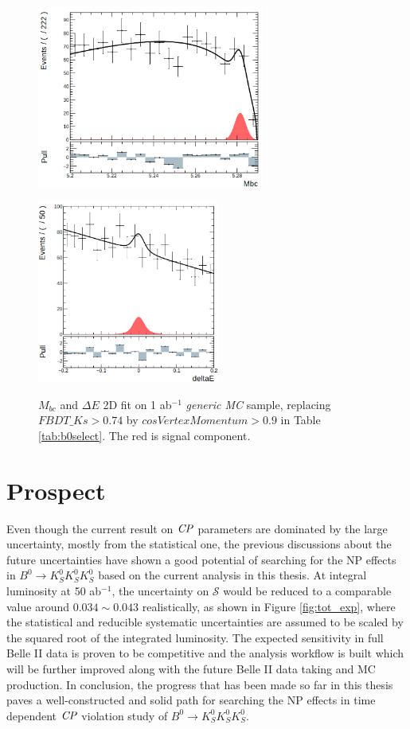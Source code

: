 \begin{figure}[htbp]
	\begin{minipage}[b]{0.5\linewidth}
		\centering 
		\includegraphics[height=6cm]{figures/mbcfit_noksdata.png}
		\label{}
	\end{minipage}
	\begin{minipage}[b]{0.5\linewidth}
		\centering 
		\includegraphics[height=6cm]{figures/dEfit_noksdata.png}
		\label{}
	\end{minipage}
	\caption{$M_{bc}$ and $\Delta E$ 2D fit on 1 ab$^{-1}$ \textit{generic MC} sample, replacing $FBDT\_Ks>0.74$ by ${cosVertexMomentum}>0.9$ in Table \ref{tab:b0select}. The red is signal component.}
	\label{fig:2Ddata_noks}
\end{figure}


\section{Prospect}
Even though the current result on $\it{CP}$ parameters are dominated by the large uncertainty, mostly from the statistical one, the previous discussions about the future uncertainties have shown a good potential of searching for the NP effects in $B^0 \to K_S^0  K_S^0  K_S^0$ based on the current analysis in this thesis. At integral luminosity at 50 ab$^{-1}$, the uncertainty on $\mathcal{S}$ would be reduced to a comparable value around $0.034\sim0.043$ realistically, as shown in Figure \ref{fig:tot_exp}, where the statistical and reducible systematic uncertainties are assumed to be scaled by the squared root of the integrated luminosity. The expected sensitivity in full Belle II data is proven to be competitive and the analysis workflow is built which will be further improved along with the future Belle II data taking and MC production. In conclusion, the progress that has been made so far in this thesis paves a well-constructed and solid path for searching the NP effects in time dependent $\it{CP}$ violation study of $B^0 \to K_S^0  K_S^0  K_S^0$. 
 
